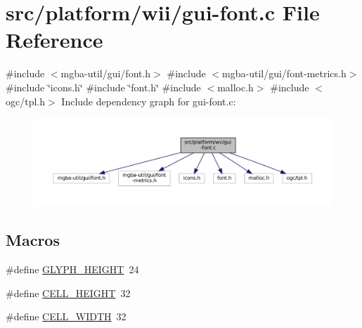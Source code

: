 \hypertarget{wii_2gui-font_8c}{}\section{src/platform/wii/gui-\/font.c File Reference}
\label{wii_2gui-font_8c}
{\ttfamily \#include $<$mgba-\/util/gui/font.\+h$>$}\newline
{\ttfamily \#include $<$mgba-\/util/gui/font-\/metrics.\+h$>$}\newline
{\ttfamily \#include \char`\"{}icons.\+h\char`\"{}}\newline
{\ttfamily \#include \char`\"{}font.\+h\char`\"{}}\newline
{\ttfamily \#include $<$malloc.\+h$>$}\newline
{\ttfamily \#include $<$ogc/tpl.\+h$>$}\newline
Include dependency graph for gui-\/font.c\+:
\nopagebreak
\begin{figure}[H]
\begin{center}
\leavevmode
\includegraphics[width=350pt]{wii_2gui-font_8c__incl}
\end{center}
\end{figure}
\subsection*{Macros}
\begin{DoxyCompactItemize}
\item 
\#define \mbox{\hyperlink{wii_2gui-font_8c_a7d0a7ac24105d9c91bce2b5a1e9a1ad3}{G\+L\+Y\+P\+H\+\_\+\+H\+E\+I\+G\+HT}}~24
\item 
\#define \mbox{\hyperlink{wii_2gui-font_8c_a8519cbc2997bb2eb21cf5571b37b38bd}{C\+E\+L\+L\+\_\+\+H\+E\+I\+G\+HT}}~32
\item 
\#define \mbox{\hyperlink{wii_2gui-font_8c_ae1dbb0e959fde337fa4e436b61bb2bac}{C\+E\+L\+L\+\_\+\+W\+I\+D\+TH}}~32
\end{DoxyCompactItemize}
